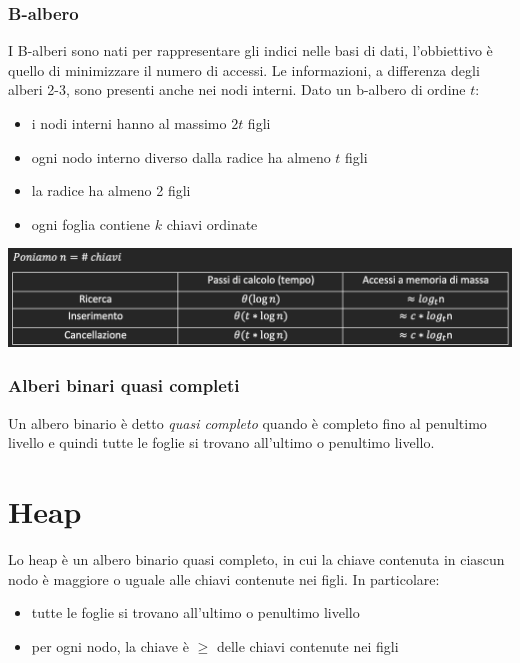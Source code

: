\documentclass[11pt, oneside]{article}   	%
\begin{document}
\subsubsection{B-albero}
I B-alberi sono nati per rappresentare gli indici nelle basi di dati, l'obbiettivo è quello di minimizzare il numero di accessi. Le informazioni, a differenza degli alberi 2-3, sono presenti anche nei nodi interni.
Dato un b-albero di ordine $t$:
\begin{itemize}
\item i nodi interni hanno al massimo $2t$ figli
\item ogni nodo interno diverso dalla radice ha almeno $t$ figli
\item la radice ha almeno 2 figli
\item ogni foglia contiene $k$ chiavi ordinate
\end{itemize}
\begin{center}
\includegraphics[scale=0.6]{balberi}
\end{center}
\subsubsection{Alberi binari quasi completi}
Un albero binario è detto \emph{quasi completo} quando è completo fino al penultimo livello e quindi tutte le foglie si trovano all'ultimo o penultimo livello.
\section{Heap}
Lo heap è un albero binario quasi completo, in cui la chiave contenuta in ciascun nodo è maggiore o uguale alle chiavi contenute nei figli. In particolare:
\begin{itemize}
\item tutte le foglie si trovano all'ultimo o penultimo livello
\item per ogni nodo, la chiave è $\geq$ delle chiavi contenute nei figli
\end{itemize}
\end{document}
